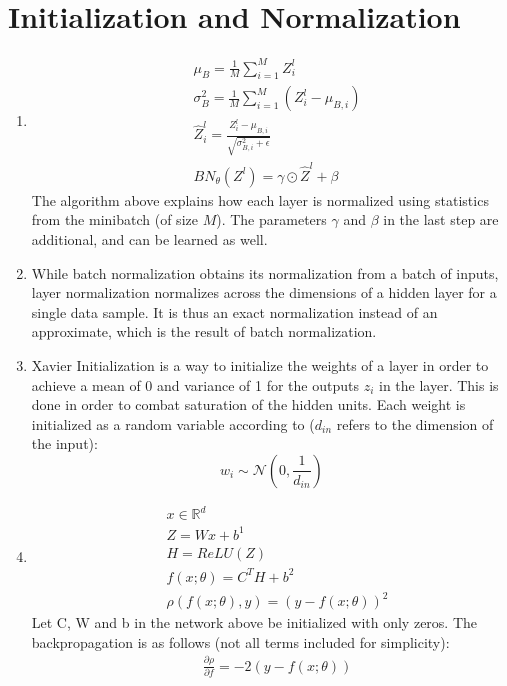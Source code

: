 \documentclass{article}
\begin{document}
\section{Initialization and Normalization}

\begin{enumerate}[label=(\alph*)]
	\item \begin{align*}
		&\mu_B = \frac{1}{M} \sum_{i=1}^M Z^l_i \\
		&\sigma_B^2 = \frac{1}{M}\sum_{i=1}^M \left(Z^l_i - \mu_{B,i}\right) \\
		&\hat{Z}_i^l = \frac{Z^l_i - \mu_{B,i}}{\sqrt{\sigma^2_{B,i} + \epsilon}} \\
		&BN_{\theta}\left(Z^l\right) = \gamma \odot \hat{Z}^l + \beta
	\end{align*}
	The algorithm above explains how each layer is normalized using statistics from the minibatch (of size $M$). The parameters $\gamma$ and $\beta$ in the last step are additional, and can be learned as well.  
	\item While batch normalization obtains its normalization from a batch of inputs, layer normalization normalizes across the dimensions of a hidden layer for a single data sample. It is thus an exact normalization instead of an approximate, which is the result of batch normalization. 
	\item Xavier Initialization is a way to initialize the weights of a layer in order to achieve a mean of 0 and variance of 1 for the outputs $z_i$ in the layer. This is done in order to combat saturation of the hidden units. Each weight is initialized as a random variable according to ($d_{in}$ refers to the dimension of the input): $$w_i \sim \mathcal{N}\left(0, \frac{1}{d_{in}}\right)$$
	\item \begin{align*}
		&x \in \mathbb{R}^d \\
		&Z = Wx + b^1 \\
		&H = ReLU(Z) \\
		&f(x; \theta) = C^TH + b^2 \\
		&\rho\left(f(x; \theta), y\right) = \left(y - f(x; \theta)\right)^2
	\end{align*}
	Let C, W and b in the network above be initialized with only zeros. The backpropagation is as follows (not all terms included for simplicity):
	\begin{align*}
		&\frac{\partial \rho}{\partial f} = -2(y - f(x; \theta)) \\

\end{align*}
\end{enumerate}
\end{document}
